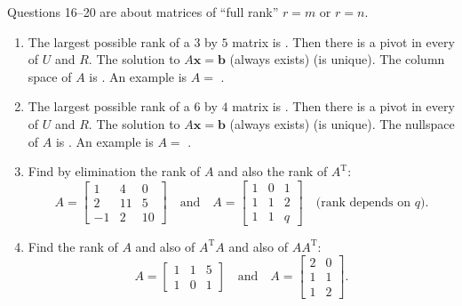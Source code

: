 \documentclass[14pt, a4paper]{article}
\begin{document}
\noindent Questions 16--20 are about matrices of ``full rank'' $r = m$ or $r = n$.
\begin{enumerate}[resume]
    \item The largest possible rank of a $3$ by $5$ matrix is \underline{\hspace{2cm}}. Then there is a pivot in every \underline{\hspace{2cm}} of $U$ and $R$. The solution to $A\mathbf{x} = \mathbf{b}$ (always exists) (is unique). The column space of $A$ is \underline{\hspace{2cm}}. An example is $A = $ \underline{\hspace{3cm}}.

    \item The largest possible rank of a $6$ by $4$ matrix is \underline{\hspace{2cm}}. Then there is a pivot in every \underline{\hspace{2cm}} of $U$ and $R$. The solution to $A\mathbf{x} = \mathbf{b}$ (always exists) (is unique). The nullspace of $A$ is \underline{\hspace{2cm}}. An example is $A = $ \underline{\hspace{3cm}}.

    \item Find by elimination the rank of $A$ and also the rank of $A^{\mathrm{T}}$:
          \[
              A = \begin{bmatrix}
                  1  & 4  & 0  \\
                  2  & 11 & 5  \\
                  -1 & 2  & 10
              \end{bmatrix}
              \quad \text{and} \quad
              A = \begin{bmatrix}
                  1 & 0 & 1 \\
                  1 & 1 & 2 \\
                  1 & 1 & q
              \end{bmatrix}
              \quad \text{(rank depends on $q$)}.
          \]

    \item Find the rank of $A$ and also of $A^{\mathrm{T}}A$ and also of $AA^{\mathrm{T}}$:
          \[
              A = \begin{bmatrix}
                  1 & 1 & 5 \\
                  1 & 0 & 1
              \end{bmatrix}
              \quad \text{and} \quad
              A = \begin{bmatrix}
                  2 & 0 \\
                  1 & 1 \\
                  1 & 2
              \end{bmatrix}.
          \]


\end{enumerate}
\end{document}
